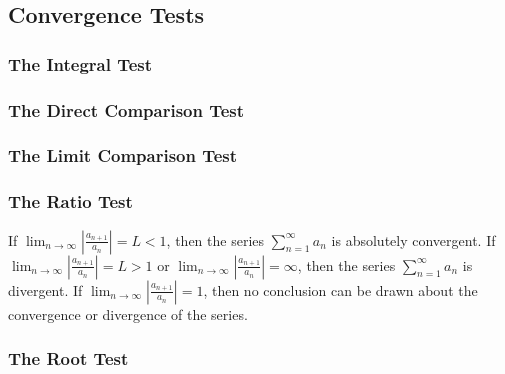 \subsection{Convergence Tests}
\subsubsection*{The Integral Test}
\subsubsection*{The Direct Comparison Test}
\subsubsection*{The Limit Comparison Test}

\subsubsection*{The Ratio Test}
\begin{theorem}
    If
    \(\displaystyle{\lim_{n\to\infty}\left|\frac{a_{n+1}}{a_n}\right|=L<1}\),
    then the series \(\sum_{n=1}^\infty a_n\) is absolutely convergent.
    If
    \(\displaystyle{\lim_{n\to\infty}\left|\frac{a_{n+1}}{a_n}\right|=L>1}\)
    or
    \(\displaystyle{\lim_{n\to\infty}\left|\frac{a_{n+1}}{a_n}\right|
    =\infty}\),
    then the series \(\sum_{n=1}^\infty a_n\) is divergent.
    If
    \(\displaystyle{\lim_{n\to\infty}\left|\frac{a_{n+1}}{a_n}\right|=1}\),
    then no conclusion can be drawn about the convergence or divergence of the
    series.
\end{theorem}
\subsubsection*{The Root Test}